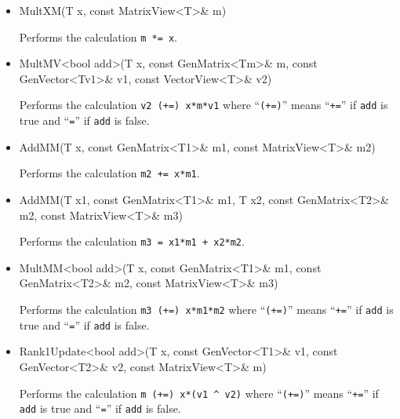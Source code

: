 \documentclass[twoside,letterpaper,11pt]{article}
\renewcommand{\tt}[1]{{\lstinline {#1}}}
\begin{document}
\begin{itemize}

\item
\begin{tmvcode}
MultXM(T x, const MatrixView<T>& m)
\end{tmvcode}
Performs the calculation \tt{m *= x}.

\item
\begin{tmvcode}
MultMV<bool add>(T x, const GenMatrix<Tm>& m, 
      const GenVector<Tv1>& v1, const VectorView<T>& v2)
\end{tmvcode}
Performs the calculation \tt{v2 (+=) x*m*v1} 
where ``\tt{(+=)}'' means ``\tt{+=}'' 
if \tt{add} is true and ``\tt{=}'' if \tt{add} is false.

\item
\begin{tmvcode}
AddMM(T x, const GenMatrix<T1>& m1, const MatrixView<T>& m2)
\end{tmvcode}
Performs the calculation \tt{m2 += x*m1}.

\item
\begin{tmvcode}
AddMM(T x1, const GenMatrix<T1>& m1, T x2, const GenMatrix<T2>& m2,
      const MatrixView<T>& m3)
\end{tmvcode}
Performs the calculation \tt{m3 = x1*m1 + x2*m2}.

\item
\begin{tmvcode}
MultMM<bool add>(T x, const GenMatrix<T1>& m1, 
      const GenMatrix<T2>& m2, const MatrixView<T>& m3)
\end{tmvcode}
Performs the calculation \tt{m3 (+=) x*m1*m2} 
where ``\tt{(+=)}'' means ``\tt{+=}'' 
if \tt{add} is true and ``\tt{=}'' if \tt{add} is false.

\item
\begin{tmvcode}
Rank1Update<bool add>(T x, const GenVector<T1>& v1, 
      const GenVector<T2>& v2, const MatrixView<T>& m)
\end{tmvcode}
Performs the calculation 
\tt{m (+=) x*(v1 ^ v2)} 
where ``\tt{(+=)}'' means ``\tt{+=}'' 
if \tt{add} is true and ``\tt{=}'' if \tt{add} is false.

\end{itemize}
\end{document}
